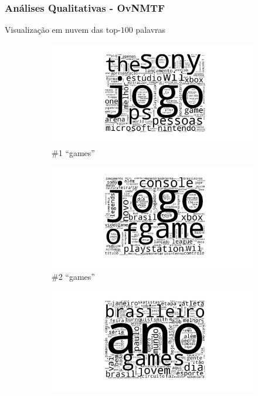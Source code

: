 \documentclass[10pt]{beamer}
\begin{document}
\begin{frame}  [shrink=15]
\frametitle{Análises Qualitativas - OvNMTF}
  Visualização em nuvem das top-$100$ palavras

    \begin{figure}[H]
    \centering
        \begin{subfigure}[b]{0.45\textwidth}
            \includegraphics[width=\textwidth]{img/ovnmtf-nc-1-tc-1.png}
            \caption{\#1 ``games''}
        \end{subfigure}
        \begin{subfigure}[b]{0.45\textwidth}
            \includegraphics[width=\textwidth]{img/ovnmtf-nc-1-tc-2.png}
            \caption{\#2 ``games''}
        \end{subfigure}
        \begin{subfigure}[b]{0.45\textwidth}
            \includegraphics[width=\textwidth]{img/ovnmtf-nc-2-tc-1.png}

\end{subfigure}
\end{figure}
\end{frame}
\end{document}
